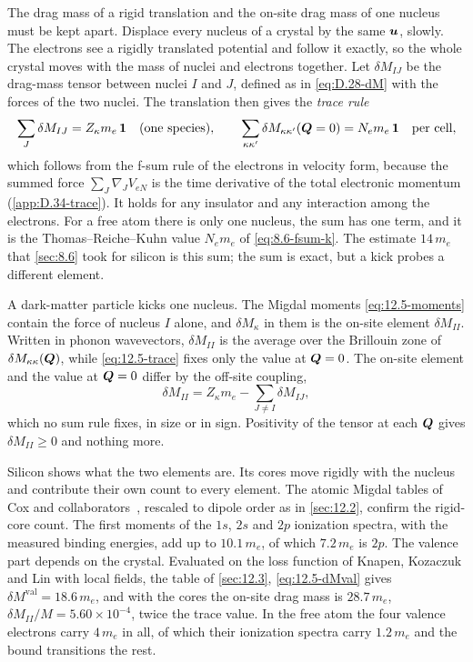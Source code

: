 The drag mass of a rigid translation and the on-site drag mass of one nucleus must be kept apart. Displace every nucleus of a crystal by the same $\bm{u}$, slowly. The electrons see a rigidly translated potential and follow it exactly, so the whole crystal moves with the mass of nuclei and electrons together. Let $\delta M_{IJ}$ be the drag-mass tensor between nuclei $I$ and $J$, defined as in \cref{eq:D.28-dM} with the forces of the two nuclei. The translation then gives the \emph{trace rule}
\begin{equation}
  \sum_J\delta M_{IJ} = Z_\kappa m_e\,\mathbf{1} \quad\text{(one species)} , \qquad
  \sum_{\kappa\kappa'}\delta M_{\kappa\kappa'}(\bm{Q} = 0) = N_em_e\,\mathbf{1} \quad\text{per cell} ,
  \label{eq:12.5-trace}
\end{equation}
which follows from the f-sum rule of the electrons in velocity form, because the summed force $\sum_J\nabla_JV_{eN}$ is the time derivative of the total electronic momentum (\cref{app:D.34-trace}). It holds for any insulator and any interaction among the electrons. For a free atom there is only one nucleus, the sum has one term, and it is the Thomas--Reiche--Kuhn value $N_em_e$ of \cref{eq:8.6-fsum-k}. The estimate $14\,m_e$ that \cref{sec:8.6} took for silicon is this sum; the sum is exact, but a kick probes a different element.

A dark-matter particle kicks one nucleus. The Migdal moments \cref{eq:12.5-moments} contain the force of nucleus $I$ alone, and $\delta M_\kappa$ in them is the on-site element $\delta M_{II}$. Written in phonon wavevectors, $\delta M_{II}$ is the average over the Brillouin zone of $\delta M_{\kappa\kappa}(\bm{Q})$, while \cref{eq:12.5-trace} fixes only the value at $\bm{Q} = 0$. The on-site element and the value at $\bm{Q} = 0$ differ by the off-site coupling,
\begin{equation}
  \delta M_{II} = Z_\kappa m_e - \sum_{J\neq I}\delta M_{IJ} ,
  \label{eq:12.5-onsite}
\end{equation}
which no sum rule fixes, in size or in sign. Positivity of the tensor at each $\bm{Q}$ gives $\delta M_{II} \ge 0$ and nothing more.

Silicon shows what the two elements are. Its cores move rigidly with the nucleus and contribute their own count to every element. The atomic Migdal tables of Cox and collaborators~\cite{cox2023precise}, rescaled to dipole order as in \cref{sec:12.2}, confirm the rigid-core count. The first moments of the $1s$, $2s$ and $2p$ ionization spectra, with the measured binding energies, add up to $10.1\,m_e$, of which $7.2\,m_e$ is $2p$. The valence part depends on the crystal. Evaluated on the loss function of Knapen, Kozaczuk and Lin with local fields, the table of \cref{sec:12.3}, \cref{eq:12.5-dMval} gives $\delta M^{\mathrm{val}} = 18.6\,m_e$, and with the cores the on-site drag mass is $28.7\,m_e$, $\delta M_{II}/M = 5.60\times10^{-4}$, twice the trace value. In the free atom the four valence electrons carry $4\,m_e$ in all, of which their ionization spectra carry $1.2\,m_e$ and the bound transitions the rest.

